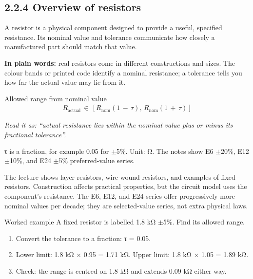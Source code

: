 \documentclass[11pt]{article}
\begin{document}
\begin{keepsection}
\section{2.2.4 Overview of resistors}

A resistor is a physical component designed to provide a useful, specified resistance. Its nominal value and tolerance communicate how closely a manufactured part should match that value.

\begin{plainbox}\textbf{In plain words:} real resistors come in different constructions and sizes. The colour bands or printed code identify a nominal resistance; a tolerance tells you how far the actual value may lie from it.\end{plainbox}

\begin{equationcard}{Allowed range from nominal value}
\[ \begin{gathered} {R}_{\text{actual}}\, \in \, [{R}_{\text{nom}}(1\, -\, τ),\, {R}_{\text{nom}}(1\, +\, τ)] \end{gathered} \]
{\small \emph{Read it as: “actual resistance lies within the nominal value plus or minus its fractional tolerance”.}\par τ is a fraction, for example 0.05 for \ensuremath{\pm}5\%. Unit: Ω. The notes show E6 \ensuremath{\pm}20\%, E12 \ensuremath{\pm}10\%, and E24 \ensuremath{\pm}5\% preferred-value series.}
\end{equationcard}

The lecture shows layer resistors, wire-wound resistors, and examples of fixed resistors. Construction affects practical properties, but the circuit model uses the component’s resistance. The E6, E12, and E24 series offer progressively more nominal values per decade; they are selected-value series, not extra physical laws.

\begin{workedbox}{Worked example}
A fixed resistor is labelled 1.8 kΩ \ensuremath{\pm}5\%. Find its allowed range.

\begin{enumerate}
\item Convert the tolerance to a fraction: τ = 0.05.
\item Lower limit: 1.8 kΩ \ensuremath{\times} 0.95 = 1.71 kΩ. Upper limit: 1.8 kΩ \ensuremath{\times} 1.05 = 1.89 kΩ.
\item Check: the range is centred on 1.8 kΩ and extends 0.09 kΩ either way.
\end{enumerate}
\end{workedbox}


\end{keepsection}
\end{document}
